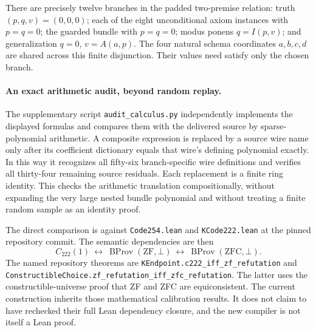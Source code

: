 There are precisely twelve branches in the padded two-premise relation:
truth $(p,q,v)=(0,0,0)$; each of the eight unconditional axiom instances
with $p=q=0$; the guarded bundle with $p=q=0$; modus ponens
$q=I(p,v)$; and generalization $q=0$, $v=A(a,p)$.
The four natural schema coordinates $a,b,c,d$ are shared across this
finite disjunction.  Their values need satisfy only the chosen branch.

\paragraph{An exact arithmetic audit, beyond random replay.}
The supplementary script \nolinkurl{audit_calculus.py} independently
implements the displayed formulas and compares them with the delivered
source by sparse-polynomial arithmetic.  A composite expression is replaced
by a source wire name only after its coefficient dictionary equals that
wire's defining polynomial exactly.  In this way it recognizes all fifty-six
branch-specific wire definitions and verifies all thirty-four remaining
source residuals.  Each replacement is a finite ring identity.  This
checks the arithmetic translation compositionally, without expanding the
very large nested bundle polynomial and without treating a finite random
sample as an identity proof.

The direct comparison is against
\nolinkurl{Code254.lean} and \nolinkurl{KCode222.lean} at the pinned repository
commit.  The semantic dependencies are then
\[
 C_{222}(1)
 \ \longleftrightarrow\
 \operatorname{BProv}(\mathrm{ZF},\bot)
 \ \longleftrightarrow\
 \operatorname{BProv}(\mathrm{ZFC},\bot).
\]
The named repository theorems are
\nolinkurl{KEndpoint.c222_iff_zf_refutation} and
\nolinkurl{ConstructibleChoice.zf_refutation_iff_zfc_refutation}.
The latter uses the constructible-universe proof that ZF and ZFC are
equiconsistent.  The current construction inherits those mathematical
calibration results.  It does not claim to have rechecked their full Lean
dependency closure, and the new compiler is not itself a Lean proof.
